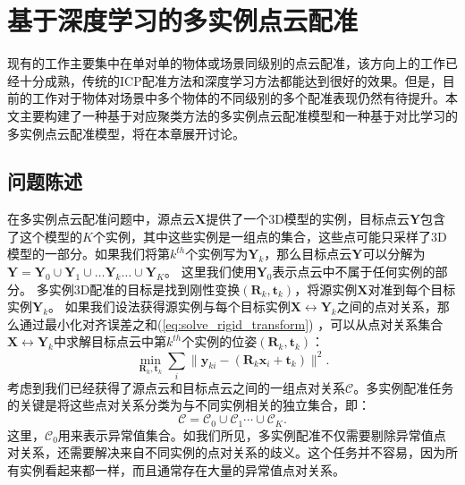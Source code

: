 \chapter{基于深度学习的多实例点云配准}
现有的工作主要集中在单对单的物体或场景同级别的点云配准，该方向上的工作已经十分成熟，传统的ICP配准方法\cite{barath2021progressive, li2020evaluation, shi2020improved}和深度学习方法\cite{qin2022geometric,barath2019progressive,barath2021progressive}都能达到很好的效果。但是，目前的工作对于物体对场景中多个物体的不同级别的多个配准表现仍然有待提升。本文主要构建了一种基于对应聚类方法的多实例点云配准模型和一种基于对比学习的多实例点云配准模型，将在本章展开讨论。
\section{问题陈述}

在多实例点云配准问题中，源点云$\boldsymbol{X}$提供了一个3D模型的实例，目标点云$\boldsymbol{Y}$包含了这个模型的$K$个实例，其中这些实例是一组点的集合，这些点可能只采样了3D模型的一部分。如果我们将第$k^{th}$个实例写为$\boldsymbol{Y}_k$，那么目标点云$\boldsymbol{Y}$可以分解为$
\boldsymbol{Y} = \boldsymbol{Y}_0 \cup \boldsymbol{Y}_1 \cup \ldots \boldsymbol{Y}_k \ldots \cup \boldsymbol{Y}_K$。
这里我们使用$\boldsymbol{Y}_0$表示点云中不属于任何实例的部分。
多实例3D配准的目标是找到刚性变换$(\boldsymbol{R}_k, \boldsymbol{t}_k)$，将源实例$\boldsymbol{X}$对准到每个目标实例$\boldsymbol{Y}_k$。
如果我们设法获得源实例与每个目标实例$\boldsymbol{X} \leftrightarrow \boldsymbol{Y}_k$之间的点对关系，那么通过最小化对齐误差之和(\ref{eq:solve_rigid_transform}) \cite{levinson2020analysis}，可以从点对关系集合$\boldsymbol{X}\leftrightarrow \boldsymbol{Y}_k$中求解目标点云中第$k^{th}$个实例的位姿$(\boldsymbol{R}_k, \boldsymbol{t}_k)$：
\begin{equation}
\underset{\boldsymbol{R}_k,\boldsymbol{t}_k}{\min}\sum_i{\parallel}\boldsymbol{y}_{ki}-(\boldsymbol{R}_k\boldsymbol{x}_i+\boldsymbol{t}_k)\parallel ^2.
\label{eq:solve_rigid_transform}
\end{equation}
考虑到我们已经获得了源点云和目标点云之间的一组点对关系$\mathcal{C}$。多实例配准任务的关键是将这些点对关系分类为与不同实例相关的独立集合，即：
\begin{equation}
\mathcal{C} = \mathcal{C}_0 \cup \mathcal{C}_1\cdots \cup \mathcal{C}_K.
\end{equation}
这里，$\mathcal{C}_0$用来表示异常值集合。如我们所见，多实例配准不仅需要剔除异常值点对关系，还需要解决来自不同实例的点对关系的歧义。这个任务并不容易，因为所有实例看起来都一样，而且通常存在大量的异常值点对关系。

